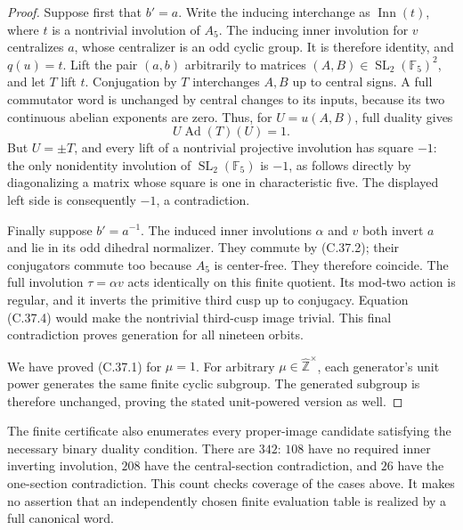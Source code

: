 \begin{proof}
Suppose first that \(b'=a\). Write the inducing interchange
as \(\operatorname{Inn}(t)\), where \(t\) is a nontrivial
involution of \(A_5\). The inducing inner involution for
\(v\) centralizes \(a\), whose centralizer is an odd
cyclic group. It is therefore identity, and \(q(u)=t\).
Lift the pair \((a,b)\) arbitrarily to matrices
\((A,B)\in\operatorname{SL}_2(\mathbb F_5)^2\), and
let \(T\) lift \(t\). Conjugation by \(T\) interchanges
\(A,B\) up to central signs. A full commutator word is
unchanged by central changes to its inputs, because its two
continuous abelian exponents are zero. Thus, for
\(U=u(A,B)\), full duality gives
\[
                         U\operatorname{Ad}(T)(U)=1.
\]
But \(U=\pm T\), and every lift of a nontrivial
projective involution has square \(-1\): the only
nonidentity involution of \(\operatorname{SL}_2(\mathbb F_5)\)
is \(-1\), as follows directly by diagonalizing a matrix
whose square is one in characteristic five. The displayed
left side is consequently \(-1\), a contradiction.

Finally suppose \(b'=a^{-1}\). The induced inner
involutions \(\alpha\) and \(v\) both invert \(a\)
and lie in its odd dihedral normalizer. They commute by
(C.37.2); their conjugators commute too because \(A_5\)
is center-free. They therefore coincide. The full involution
\(\tau=\alpha v\) acts identically on this finite
quotient. Its mod-two action is regular, and it inverts the
primitive third cusp up to conjugacy. Equation (C.37.4)
would make the nontrivial third-cusp image trivial. This final
contradiction proves generation for all nineteen orbits.

We have proved (C.37.1) for \(\mu=1\). For arbitrary
\(\mu\in\widehat{\mathbb Z}^{\times}\), each generator's
unit power generates the same finite cyclic subgroup.
The generated subgroup is therefore unchanged, proving
the stated unit-powered version as well.
\end{proof}

The finite certificate also enumerates every proper-image
candidate satisfying the necessary binary duality condition.
There are \(342\): \(108\) have no required inner inverting
involution, \(208\) have the central-section contradiction,
and \(26\) have the one-section contradiction. This count
checks coverage of the cases above. It makes no assertion that
an independently chosen finite evaluation table is realized by
a full canonical word.
